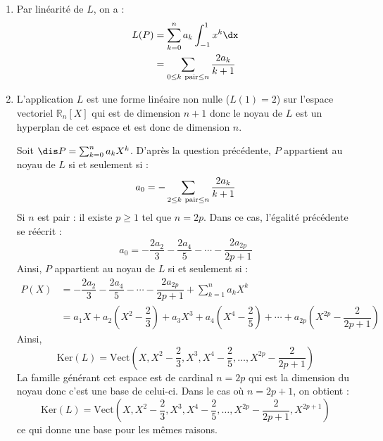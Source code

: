 \documentclass[a4paper,10pt]{report}
\begin{document}
\corr \begin{enumerate}
\item Par linéarité de $L$, on a :
\begin{align*}
L(P) & = \sum_{k=0}^n a_k \int_{-1}^{1} x^k \dx \\
& = \sum_{0 \leq k \hbox{ {\scriptsize pair}} \leq n} \dfrac{2a_k}{k+1} 
\end{align*}
\item L'application $L$ est une forme linéaire non nulle ($L(1)=2$) sur l'espace vectoriel $\mathbb{R}_n[X]$ qui est de dimension $n+1$ donc le noyau de $L$ est un hyperplan de cet espace et est donc de dimension $n$.

\medskip

\noindent Soit $\dis P= \sum_{k=0}^n a_k X^k$. D'après la question précédente, $P$ appartient au noyau de $L$ si et seulement si :
$$ a_0 = - \sum_{2 \leq k \hbox{ {\scriptsize pair}} \leq n} \dfrac{2a_k}{k+1}$$
Si $n$ est pair : il existe $p \geq 1$ tel que $n=2p$. Dans ce cas, l'égalité précédente se réécrit :
$$ a_0 = - \dfrac{2a_2}{3} - \dfrac{2a_4}{5} - \cdots - \dfrac{2a_{2p}}{2p+1}$$
Ainsi, $P$ appartient au noyau de $L$ si et seulement si :
\begin{align*}
P(X) & =  - \dfrac{2a_2}{3} - \dfrac{2a_4}{5} - \cdots - \dfrac{2a_{2p}}{2p+1} + \sum_{k=1}^n a_k X^k \\
& = a_1 X + a_2 \left(X^2   - \dfrac{2}{3} \right) + a_3 X^3 +  a_4 \left(X^4   - \dfrac{2}{5} \right) + \cdots +  a_{2p} \left(X^{2p}   - \dfrac{2}{2p+1} \right)
\end{align*}
Ainsi,
$$ \textrm{Ker}(L) = \textrm{Vect} \left(X,X^2   - \dfrac{2}{3},X^3,X^4   - \dfrac{2}{5}, \ldots, X^{2p}   - \dfrac{2}{2p+1} \right)$$
La famille générant cet espace est de cardinal $n=2p$ qui est la dimension du noyau donc c'est une base de celui-ci. Dans le cas où $n=2p+1$, on obtient :
$$ \textrm{Ker}(L) = \textrm{Vect} \left(X,X^2   - \dfrac{2}{3},X^3,X^4   - \dfrac{2}{5}, \ldots, X^{2p}   - \dfrac{2}{2p+1}, X^{2p+1} \right)$$
ce qui donne une base pour les mêmes raisons.

\end{enumerate}
\end{document}
